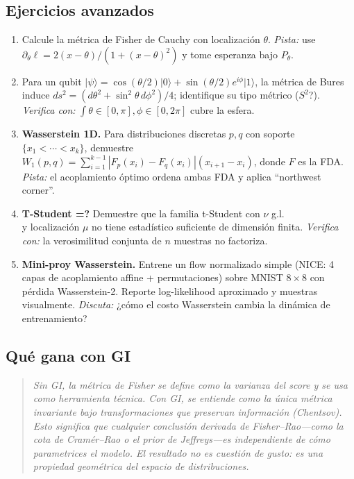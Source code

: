 \subsection*{Ejercicios avanzados}
\begin{enumerate}[resume]
	\item[$\star\star$] Calcule la métrica de Fisher de $\mathrm{Cauchy}$ con localización $\theta$. \textit{Pista:} use $\partial_\theta \ell = 2(x-\theta)/(1+(x-\theta)^2)$ y tome esperanza bajo $P_\theta$.
	\item[$\star\star\star$] Para un qubit $|\psi\rangle=\cos(\theta/2)|0\rangle+\sin(\theta/2)e^{i\phi}|1\rangle$, la métrica de Bures induce $ds^2=(d\theta^2+\sin^2\theta\,d\phi^2)/4$; identifique su tipo métrico ($S^2$?). \textit{Verifica con:} $\int\theta\in[0,\pi],\phi\in[0,2\pi]$ cubre la esfera.
	\item[$\star\star\star$] \textbf{Wasserstein 1D.} Para distribuciones discretas $p,q$ con soporte $\{x_1<\cdots<x_k\}$, demuestre $W_1(p,q)=\sum_{i=1}^{k-1}|F_p(x_i)-F_q(x_i)|(x_{i+1}-x_i)$, donde $F$ es la FDA. \textit{Pista:} el acoplamiento óptimo ordena ambas FDA y aplica ``northwest corner''.
	\item[$\star\star\star$] \textbf{T-Student =?} Demuestre que la familia t-Student con $\nu$ g.l.\\ y localización $\mu$ no tiene estadístico suficiente de dimensión finita. \textit{Verifica con:} la verosimilitud conjunta de $n$ muestras no factoriza.
	\item[$\star\star\star\star$] \textbf{Mini-proy Wasserstein.} Entrene un flow normalizado simple (NICE: 4 capas de acoplamiento affine + permutaciones) sobre MNIST $8\times 8$ con pérdida Wasserstein-2. Reporte log-likelihood aproximado y muestras visualmente. \textit{Discuta:} ¿cómo el costo Wasserstein cambia la dinámica de entrenamiento?
\end{enumerate}

\subsection*{Qué gana con GI}
\begin{quote}
	\itshape
	Sin GI, la métrica de Fisher se define como la varianza del score y se usa como herramienta técnica.  Con GI, se entiende como la \emph{única} métrica invariante bajo transformaciones que preservan información (Chentsov).  Esto significa que cualquier conclusión derivada de Fisher--Rao---como la cota de Cramér--Rao o el prior de Jeffreys---es \emph{independiente de cómo parametrices el modelo}.  El resultado no es cuestión de gusto: es una propiedad geométrica del espacio de distribuciones.
\end{quote}
